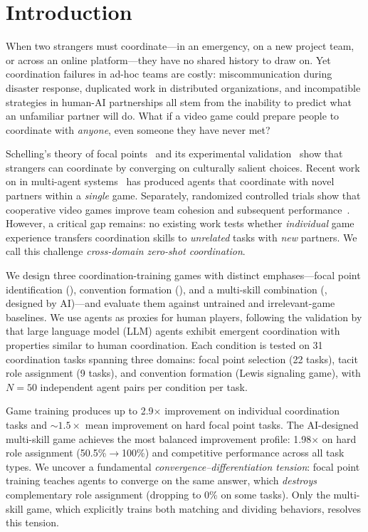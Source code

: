 \section{Introduction}
\label{sec:intro}

When two strangers must coordinate---in an emergency, on a new project team, or across an online platform---they have no shared history to draw on.
Yet coordination failures in ad-hoc teams are costly: miscommunication during disaster response, duplicated work in distributed organizations, and incompatible strategies in human-AI partnerships all stem from the inability to predict what an unfamiliar partner will do.
What if a video game could prepare people to coordinate with \emph{anyone}, even someone they have never met?

Schelling's theory of focal points~\citep{schelling1960strategy} and its experimental validation~\citep{mehta1994focal} show that strangers can coordinate by converging on culturally salient choices.
Recent work on \zsc in multi-agent systems~\citep{hu2020otherplay, li2024tackling} has produced agents that coordinate with novel partners within a \emph{single} game.
Separately, randomized controlled trials show that cooperative video games improve team cohesion and subsequent performance~\citep{keith2021team, greitemeyer2014prosocial}.
However, a critical gap remains: no existing work tests whether \emph{individual} game experience transfers coordination skills to \emph{unrelated} tasks with \emph{new} partners.
We call this challenge \emph{cross-domain zero-shot coordination}.

We design three coordination-training games with distinct emphases---focal point identification (\mindmatch), convention formation (\signalcraft), and a multi-skill combination (\syncminds, designed by AI)---and evaluate them against untrained and irrelevant-game baselines.
We use \gptfour agents as proxies for human players, following the validation by \citet{riedl2026emergent} that large language model (LLM) agents exhibit emergent coordination with properties similar to human coordination.
Each condition is tested on 31 coordination tasks spanning three domains: focal point selection (22 tasks), tacit role assignment (9 tasks), and convention formation (Lewis signaling game), with $N{=}50$ independent agent pairs per condition per task.

Game training produces up to 2.9$\times$ improvement on individual coordination tasks and ${\sim}1.5\times$ mean improvement on hard focal point tasks.
The AI-designed multi-skill game \syncminds achieves the most balanced improvement profile: 1.98$\times$ on hard role assignment (50.5\%$\to$100\%) and competitive performance across all task types.
We uncover a fundamental \emph{convergence--differentiation tension}: focal point training teaches agents to converge on the same answer, which \emph{destroys} complementary role assignment (dropping to 0\% on some tasks).
Only the multi-skill game, which explicitly trains both matching and dividing behaviors, resolves this tension.

